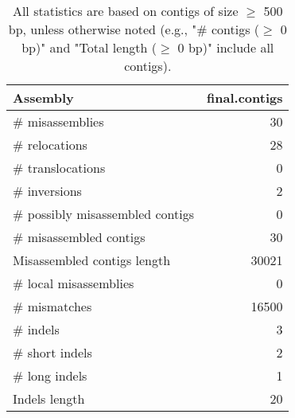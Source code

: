 \documentclass[12pt,a4paper]{article}
\begin{document}
\begin{table}[ht]
\begin{center}
\caption{All statistics are based on contigs of size $\geq$ 500 bp, unless otherwise noted (e.g., "\# contigs ($\geq$ 0 bp)" and "Total length ($\geq$ 0 bp)" include all contigs).}
\begin{tabular}{|l*{1}{|r}|}
\hline
Assembly & final.contigs \\ \hline
\# misassemblies & 30 \\ \hline
\hspace{5mm}\# relocations & 28 \\ \hline
\hspace{5mm}\# translocations & 0 \\ \hline
\hspace{5mm}\# inversions & 2 \\ \hline
\# possibly misassembled contigs & 0 \\ \hline
\# misassembled contigs & 30 \\ \hline
Misassembled contigs length & 30021 \\ \hline
\# local misassemblies & 0 \\ \hline
\# mismatches & 16500 \\ \hline
\# indels & 3 \\ \hline
\hspace{5mm}\# short indels & 2 \\ \hline
\hspace{5mm}\# long indels & 1 \\ \hline
Indels length & 20 \\ \hline
\end{tabular}
\end{center}
\end{table}
\end{document}
